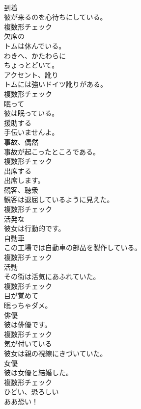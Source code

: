 \documentclass[8pt]{extreport}
\begin{document}
\begin{CJK}{UTF8}{min}
\\	[名詞]	到着	
\\	彼が来るのを心待ちにしている。	
\\	複数形チェック
\\	[形容詞]	欠席の	
\\	トムは休んでいる。	
\\	[副詞]	わきへ、かたわらに	
\\	ちょっとどいて。	
\\	[名詞]	アクセント、訛り	
\\	トムには強いドイツ訛りがある。	
\\	複数形チェック
\\	[形容詞]	眠って	
\\	彼は眠っている。	
\\	[動詞]	援助する	
\\	手伝いませんよ。	
\\	[名詞]	事故、偶然	
\\	事故が起こったところである。	
\\	複数形チェック
\\	[動詞]	出席する	
\\	出席します。	
\\	[名詞]	観客、聴衆	
\\	観客は退屈しているように見えた。	
\\	複数形チェック
\\	[形容詞]	活発な	
\\	彼女は行動的です。	
\\	[名詞]	自動車	
\\	この工場では自動車の部品を製作している。	
\\	複数形チェック
\\	[名詞]	活動	
\\	その街は活気にあふれていた。	
\\	複数形チェック
\\	[形容詞]	目が覚めて	
\\	眠っちゃダメ。	
\\	[名詞]	俳優	
\\	彼は俳優です。	
\\	複数形チェック
\\	[形容詞]	気が付いている	
\\	彼女は親の視線にきづいていた。	
\\	[名詞]	女優	
\\	彼は女優と結婚した。	
\\	複数形チェック
\\	[形容詞]	ひどい、恐ろしい	
\\	ああ恐い！	

\end{CJK}
\end{document}
